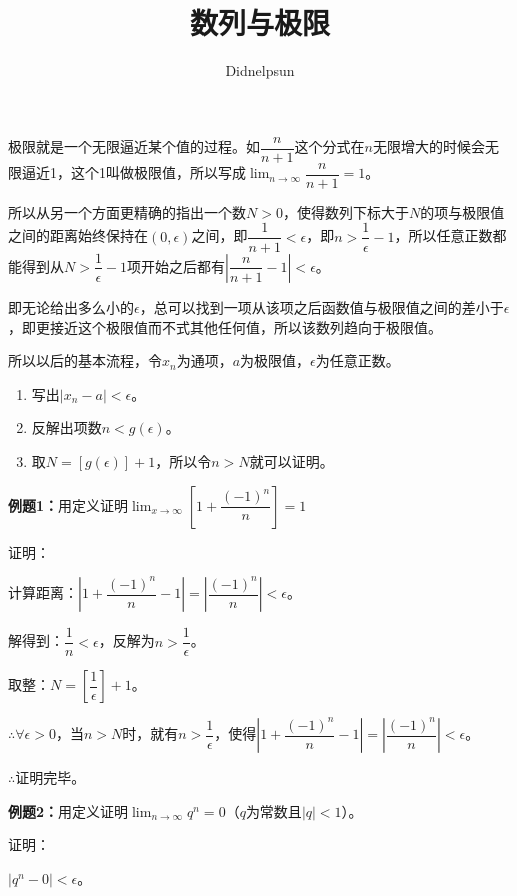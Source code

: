 \documentclass[UTF8]{ctexart}
\author{Didnelpsun}
\title{数列与极限}
\begin{document}
\maketitle
\thispagestyle{empty}
\tableofcontents
\thispagestyle{empty}
\newpage
\pagestyle{plain}
\setcounter{page}{1}

极限就是一个无限逼近某个值的过程。如$\dfrac{n}{n+1}$这个分式在$n$无限增大的时候会无限逼近1，这个1叫做极限值，所以写成$\lim_{n\to\infty}\dfrac{n}{n+1}=1$。

所以从另一个方面更精确的指出一个数$N>0$，使得数列下标大于$N$的项与极限值之间的距离始终保持在$(0,\epsilon)$之间，即$\dfrac{1}{n+1}<\epsilon$，即$n>\dfrac{1}{\epsilon}-1$，所以任意正数都能得到从$N>\dfrac{1}{\epsilon}-1$项开始之后都有$\left\vert\dfrac{n}{n+1}-1\right\vert<\epsilon$。

即无论给出多么小的$\epsilon$，总可以找到一项从该项之后函数值与极限值之间的差小于$\epsilon$，即更接近这个极限值而不式其他任何值，所以该数列趋向于极限值。

所以以后的基本流程，令$x_n$为通项，$a$为极限值，$\epsilon$为任意正数。

\begin{enumerate}
    \item 写出$\vert x_n-a|<\epsilon$。
    \item 反解出项数$n<g(\epsilon)$。
    \item 取$N=[g(\epsilon)]+1$，所以令$n>N$就可以证明。
\end{enumerate}

\textbf{例题1：}用定义证明$\lim_{x\to\infty}\left[1+\dfrac{(-1)^n}{n}\right]=1$

证明：

计算距离：$\left\vert 1+\dfrac{(-1)^n}{n}-1\right\vert=\left\vert\dfrac{(-1)^n}{n}\right\vert<\epsilon$。

解得到：$\dfrac{1}{n}<\epsilon$，反解为$n>\dfrac{1}{\epsilon}$。

取整：$N=\left[\dfrac{1}{\epsilon}\right]+1$。

$\therefore\forall\epsilon>0$，当$n>N$时，就有$n>\dfrac{1}{\epsilon}$，使得$\left\vert 1+\dfrac{(-1)^n}{n}-1\right\vert=\left\vert\dfrac{(-1)^n}{n}\right\vert<\epsilon$。

$\therefore$证明完毕。

\textbf{例题2：}用定义证明$\lim_{n\to\infty}q^n=0$（$q$为常数且$\vert q\vert<1$）。

证明：

$\vert q^n-0\vert<\epsilon$。
\end{document}
